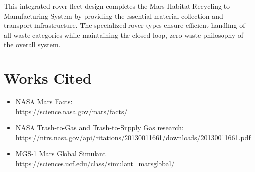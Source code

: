 \documentclass[12pt, a4paper]{article}
\begin{document}
This integrated rover fleet design completes the Mars Habitat Recycling-to-Manufacturing System by providing the essential material collection and transport infrastructure. The specialized rover types ensure efficient handling of all waste categories while maintaining the closed-loop, zero-waste philosophy of the overall system.

\section*{Works Cited}
\begin{itemize}
    \item NASA Mars Facts: \\ \url{https://science.nasa.gov/mars/facts/}
    \item NASA Trash-to-Gas and Trash-to-Supply Gas research: \\ \url{https://ntrs.nasa.gov/api/citations/20130011661/downloads/20130011661.pdf}
    \item MGS-1 Mars Global Simulant \\ \url{https://sciences.ucf.edu/class/simulant_marsglobal/}
\end{itemize}
\end{document}
